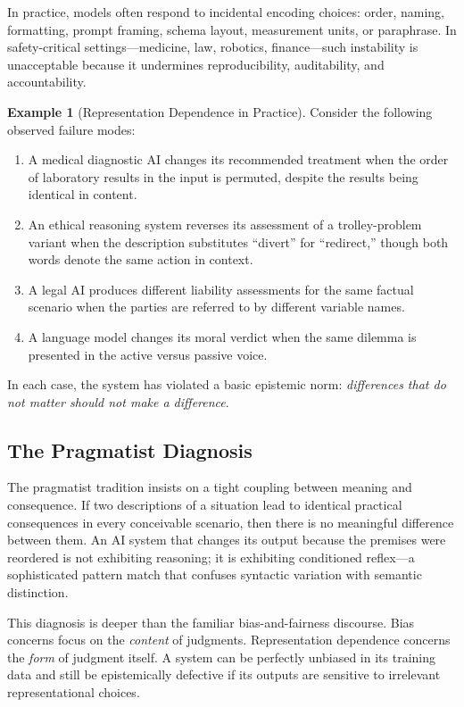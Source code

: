 \documentclass[12pt,letterpaper]{article}
\theoremstyle{definition}
\newtheorem{example}[theorem]{Example}
\theoremstyle{plain}
\begin{document}
In practice, models often respond to incidental encoding choices: order, naming, formatting, prompt framing, schema layout, measurement units, or paraphrase. In safety-critical settings---medicine, law, robotics, finance---such instability is unacceptable because it undermines reproducibility, auditability, and accountability.

\begin{example}[Representation Dependence in Practice]
\label{ex:rep-dep}
Consider the following observed failure modes:
\begin{enumerate}[label=(\alph*)]
    \item A medical diagnostic AI changes its recommended treatment when the order of laboratory results in the input is permuted, despite the results being identical in content.
    \item An ethical reasoning system reverses its assessment of a trolley-problem variant when the description substitutes ``divert'' for ``redirect,'' though both words denote the same action in context.
    \item A legal AI produces different liability assessments for the same factual scenario when the parties are referred to by different variable names.
    \item A language model changes its moral verdict when the same dilemma is presented in the active versus passive voice.
\end{enumerate}
In each case, the system has violated a basic epistemic norm: \emph{differences that do not matter should not make a difference}.
\end{example}

\subsection{The Pragmatist Diagnosis}

The pragmatist tradition insists on a tight coupling between meaning and consequence. If two descriptions of a situation lead to identical practical consequences in every conceivable scenario, then there is no meaningful difference between them. An AI system that changes its output because the premises were reordered is not exhibiting reasoning; it is exhibiting conditioned reflex---a sophisticated pattern match that confuses syntactic variation with semantic distinction.

This diagnosis is deeper than the familiar bias-and-fairness discourse. Bias concerns focus on the \emph{content} of judgments. Representation dependence concerns the \emph{form} of judgment itself. A system can be perfectly unbiased in its training data and still be epistemically defective if its outputs are sensitive to irrelevant representational choices.
\end{document}
